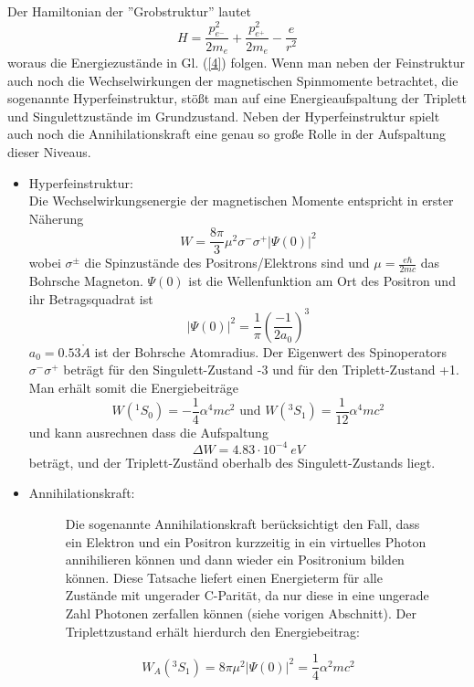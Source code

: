 Der Hamiltonian der ''Grobstruktur'' lautet $$H = \frac{p_{e^-}^2}{2m_e}+\frac{p_{e^+}^2}{2m_e}-\frac{e}{r^2}$$ woraus die Energiezustände in Gl. (\ref{4}) folgen. Wenn man neben der Feinstruktur auch noch die Wechselwirkungen der magnetischen Spinmomente betrachtet, die sogenannte Hyperfeinstruktur, stößt man auf eine Energieaufspaltung der Triplett und Singulettzustände im Grundzustand. Neben der Hyperfeinstruktur spielt auch noch die Annihilationskraft eine genau so große Rolle in der Aufspaltung dieser Niveaus.

\begin{itemize}

\item Hyperfeinstruktur:\\
Die Wechselwirkungsenergie der magnetischen Momente entspricht in erster Näherung
\begin{equation} W = \frac{8\pi}{3}\mu^2\sigma^-\sigma^+|\Psi(0)|^2 \end{equation}
wobei $\sigma^\pm$ die Spinzustände des Positrons/Elektrons sind und $\mu = \frac{e\hbar}{2mc}$ das Bohrsche Magneton. $\Psi(0)$ ist die Wellenfunktion am Ort des Positron und ihr Betragsquadrat ist
$$|\Psi(0)|^2 = \frac{1}{\pi}\left(\frac{-1}{2a_0}\right)^3$$
$a_0 = 0.53 \mathring A$ ist der Bohrsche Atomradius. Der Eigenwert des Spinoperators $\sigma^-\sigma^+$ beträgt für den Singulett-Zustand -3 und für den Triplett-Zustand +1. Man erhält somit die Energiebeiträge
$$W(^1S_0) = -\frac{1}{4}\alpha^4mc^2 \text{\ \ \ \ und \ \ \ \ } W(^3S_1) = \frac{1}{12}\alpha^4mc^2$$
und kann ausrechnen dass die Aufspaltung
\begin{equation} \Delta W = 4.83 \cdot 10^{-4}\ eV \end{equation} beträgt, und der Triplett-Zuständ oberhalb des Singulett-Zustands liegt.

\item Annihilationskraft:\\
\begin{figure}[H]
	\begin{minipage}{0.5\textwidth}
	Die sogenannte Annihilationskraft berücksichtigt den Fall, dass ein Elektron und ein Positron kurzzeitig in ein virtuelles Photon annihilieren können und dann wieder ein Positronium bilden können. Diese Tatsache liefert einen Energieterm für alle Zustände mit ungerader C-Parität, da nur diese in eine ungerade Zahl Photonen zerfallen können (siehe vorigen Abschnitt). Der Triplettzustand erhält hierdurch den Energiebeitrag:

\begin{equation} W_A(^3S_1)=8\pi\mu^2|\Psi(0)|^2 = \frac{1}{4}\alpha^2mc^2 \end{equation}


\end{minipage}
\end{figure}
\end{itemize}
